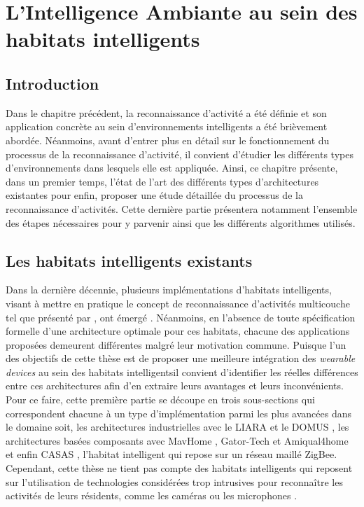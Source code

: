 \chapter{L'Intelligence Ambiante au sein des habitats intelligents}
\label{chap:2}

\section{Introduction}

Dans le chapitre précédent, la reconnaissance d'activité a été définie et son application concrète au sein d'environnements intelligents a été brièvement abordée. Néanmoins, avant d'entrer plus en détail sur le fonctionnement du processus de la reconnaissance d'activité, il convient d'étudier les différents types d'environnements dans lesquels elle est appliquée. Ainsi, ce chapitre présente, dans un premier temps, l'état de l'art des différents types d'architectures existantes pour enfin, proposer une étude détaillée du processus de la reconnaissance d'activités. Cette dernière partie présentera notamment l'ensemble des étapes nécessaires pour y parvenir ainsi que les différents algorithmes utilisés.

\section{Les habitats intelligents existants}

Dans la dernière décennie, plusieurs implémentations d'habitats intelligents, visant à mettre en pratique le concept de reconnaissance d'activités multicouche tel que présenté par \cite{Roy2013}, ont émergé \citep{DJCook2003, Helal2005, Giroux2009, Cook2013, Bouchard2014, Lago2017}. Néanmoins, en l'absence de toute spécification formelle d'une architecture optimale pour ces habitats, chacune des applications proposées demeurent différentes malgré leur motivation commune. Puisque l'un des objectifs de cette thèse est de proposer une meilleure intégration des \textit{wearable devices} au sein des habitats intelligents\textemdash il convient d'identifier les réelles différences entre ces architectures afin d'en extraire leurs avantages et leurs inconvénients. Pour ce faire, cette première partie se découpe en trois sous-sections qui correspondent chacune à un type d'implémentation parmi les plus avancées dans le domaine soit, les architectures industrielles avec le \acs{LIARA} \citep{Bouchard2014} et le \acs{DOMUS} \citep{Giroux2009}, les architectures basées composants avec MavHome \citep{DJCook2003}, Gator-Tech \citep{Helal2005} et Amiqual4home \citep{Lago2017} et enfin CASAS \citep{Cook2013}, l'habitat intelligent qui repose sur un réseau maillé ZigBee. Cependant, cette thèse ne tient pas compte des habitats intelligents qui reposent sur l'utilisation de technologies considérées trop intrusives pour reconnaître les activités de leurs résidents, comme les caméras ou les microphones \citep{Brumitt2000, Vacher2011}.

